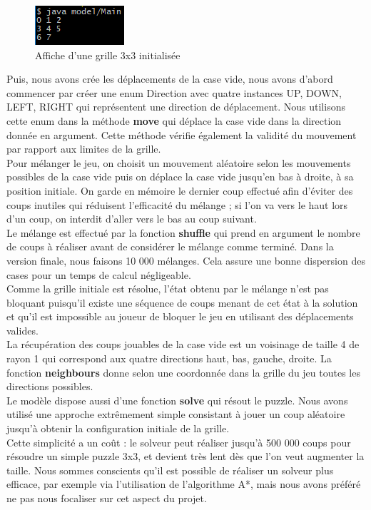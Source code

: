 \documentclass[a4paper,12pt]{article} %
\begin{document}
\begin{figure}[!h]
\centering
\includegraphics[scale=1]{images/Capture2.PNG}
\caption{Affiche d'une grille 3x3 initialisée}
\end{figure}

Puis, nous avons crée les déplacements de la case vide, nous avons d'abord commencer par créer une enum Direction avec quatre instances UP, DOWN, LEFT, RIGHT qui représentent une direction de déplacement. Nous utilisons cette enum dans la méthode \textbf{move} qui déplace la case vide dans la direction donnée en argument. Cette méthode vérifie également la validité du mouvement par rapport aux limites de la grille. \\

Pour mélanger le jeu, on choisit un mouvement aléatoire selon les mouvements possibles de la case vide puis on déplace la case vide jusqu'en bas à droite, à sa position initiale. On garde en mémoire le dernier coup effectué afin d'éviter des coups inutiles qui réduisent l'efficacité du mélange ; si l'on va vers le haut lors d'un coup, on interdit d'aller vers le bas au coup suivant.\\
Le mélange est effectué par la fonction \textbf{shuffle} qui prend en argument le nombre de coups à réaliser avant de considérer le mélange comme terminé. Dans la version finale, nous faisons 10 000 mélanges. Cela assure une bonne dispersion des cases pour un temps de calcul négligeable.\\
Comme la grille initiale est résolue, l'état obtenu par le mélange n'est pas bloquant puisqu'il existe une séquence de coups menant de cet état à la solution et qu'il est impossible au joueur de bloquer le jeu en utilisant des déplacements valides.\\

La récupération des coups jouables de la case vide est un voisinage de taille 4 de rayon 1 qui correspond aux quatre directions haut, bas, gauche, droite. La fonction \textbf{neighbours} donne selon une coordonnée dans la grille du jeu toutes les directions possibles.\\

Le modèle dispose aussi d'une fonction \textbf{solve} qui résout le puzzle. Nous avons utilisé une approche extrêmement simple consistant à jouer un coup aléatoire jusqu'à obtenir la configuration initiale de la grille.\\
Cette simplicité a un coût : le solveur peut réaliser jusqu'à 500 000 coups pour résoudre un simple puzzle 3x3, et devient très lent dès que l'on veut augmenter la taille.
Nous sommes conscients qu'il est possible de réaliser un solveur plus efficace, par exemple via l'utilisation de l'algorithme A*, mais nous avons préféré ne pas nous focaliser sur cet aspect du projet.\\
\end{document}
